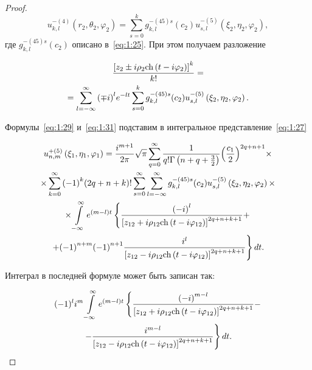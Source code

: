\begin{russian}
\begin{proof}
\begin{equation}\label{eq:1:30}
u_{k,l}^{ - (4)}\left( {{r_2},{\theta _2},{\varphi _2}} \right) = \sum\limits_{s = 0}^k {g_{k,l}^{ - (45)s}} ({c_2})u_{s,l}^{ - (5)}\left( {{\xi _2},{\eta _2},{\varphi _2}} \right),
\end{equation}
где $g_{k,l}^{ - (45)s}({c_2})$ описано в~\eqref{eq:1:25}. При этом получаем разложение

\begin{multline}\label{eq:1:31}
\frac{{{{\left[ {{z_2} \pm i{\rho _2}{\mathop{\rm ch}\nolimits} \left( {t - i{\varphi _2}} \right)} \right]}^k}}}{{k!}} = \\
= \sum\limits_{l =  - \infty }^\infty  {{{( \mp i)}^l}} {e^{ - lt}}\sum\limits_{s = 0}^k {g_{k,l}^{ - (45)s}} ({c_2})u_{s,l}^{ - (5)}\left( {{\xi _2},{\eta _2},{\varphi _2}} \right).
\end{multline}

Формулы~\eqref{eq:1:29} и~\eqref{eq:1:31} подставим в интегральное представление~\eqref{eq:1:27}

\begin{multline}\label{eq:1:32}
u_{n,m}^{ + (5)}\left( {{\xi _1},{\eta _1},{\varphi _1}} \right) = \frac{{{i^{m + 1}}}}{{2\pi }}\sqrt \pi  \sum\limits_{q = 0}^\infty  {\frac{1}{{q!\Gamma \left( {n + q + \frac{3}{2}} \right)}}} {\left( {\frac{{{c_1}}}{2}} \right)^{2q + n + 1}} \times \\
\times \sum\limits_{k = 0}^\infty  {{{( - 1)}^k}} (2q + n + k)!\sum\limits_{s = 0}^\infty  {\sum\limits_{l =  - \infty }^\infty  {g_{k,l}^{ - (45)s}} } ({c_2})u_{s,l}^{ - (5)}\left( {{\xi _2},{\eta _2},{\varphi _2}} \right) \times \\
\times \int\limits_{ - \infty }^\infty  {{e^{(m - l)t}}} \left\{ {\frac{{{{( - i)}^l}}}{{{{\left[ {{z_{12}} + i{\rho _{12}}{\mathop{\rm ch}\nolimits} \left( {t - i{\varphi _{12}}} \right)} \right]}^{2q + n + k + 1}}}} + } \right.\\
\left. { + {{( - 1)}^{n + m}}{{( - 1)}^{n + 1}}\frac{{{i^l}}}{{{{\left[ {{z_{12}} - i{\rho _{12}}{\mathop{\rm ch}\nolimits} \left( {t - i{\varphi _{12}}} \right)} \right]}^{2q + n + k + 1}}}}} \right\}dt.
\end{multline}

Интеграл в последней формуле может быть записан так:

\begin{multline*}
{( - 1)^l}{i^m}\int\limits_{ - \infty }^\infty  {{e^{(m - l)t}}} \left\{ {\frac{{{{( - i)}^{m - l}}}}{{{{\left[ {{z_{12}} + i{\rho _{12}}{\mathop{\rm ch}\nolimits} \left( {t - i{\varphi _{12}}} \right)} \right]}^{2q + n + k + 1}}}} - } \right.\\
\left. { - \frac{{{i^{m - l}}}}{{{{\left[ {{z_{12}} - i{\rho _{12}}{\mathop{\rm ch}\nolimits} \left( {t - i{\varphi _{12}}} \right)} \right]}^{2q + n + k + 1}}}}} \right\}dt.
\end{multline*}


\end{proof}
\end{russian}
